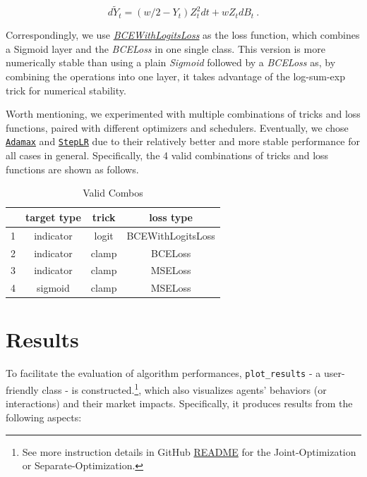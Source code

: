 \documentclass[a4paper,10pt]{article}
\newcommand{\1}{\mathbf{1}}
\begin{document}
\begin{equation}
    d \tilde{Y}_t = (w/2-Y_t)Z_t^2dt + wZ_tdB_t~.
\end{equation} 

Correspondingly, we use \href{https://pytorch.org/docs/stable/generated/torch.nn.BCEWithLogitsLoss.html}{\textit{BCEWithLogitsLoss}} as the loss function, which combines a Sigmoid layer and the \textit{BCELoss} in one single class. This version is more numerically stable than using a plain \textit{Sigmoid} followed by a  \textit{BCELoss} as, by combining the operations into one layer, it takes advantage of the log-sum-exp trick for numerical stability.

Worth mentioning, we experimented with multiple combinations of tricks
and loss functions, paired with different optimizers and schedulers.
Eventually, we chose
\href{https://pytorch.org/docs/stable/generated/torch.optim.Adamax.html}{\texttt{Adamax}}
and
\href{https://pytorch.org/docs/stable/generated/torch.optim.lr_scheduler.StepLR.html}{\texttt{StepLR}}
due to their relatively better and more stable performance for all cases
in general. Specifically, the 4 valid combinations of tricks and
loss functions are shown as follows.

\begin{table}[ht]
    \centering
    \begin{tabular}{*{4}{c}}
        \toprule
        \, & \textbf{target type} & \textbf{trick} & \textbf{loss type} \\
        \midrule
        1 & indicator & logit & BCEWithLogitsLoss \\
        2 & indicator & clamp & BCELoss \\
        3 & indicator & clamp & MSELoss \\
        4 & sigmoid   & clamp & MSELoss \\
        \toprule
    \end{tabular}
    \caption{Valid Combos}
    \label{tab:valid-combos}
\end{table}



\newpage

\section{Results}\label{results}

To facilitate the evaluation of algorithm performances, \texttt{plot\_results} - a
user-friendly class - is constructed.\footnote{See more instruction details in GitHub \href{https://github.com/OrangeAoo/PA-MFG-FBSDE/blob/3cffc5e8dbe09fbc880f6c2c70d76e0b6a1b8c3c/2Period/Joint_Optim_2Prdx1/README.md}{README} for the Joint-Optimization or Separate-Optimization.}, which also visualizes agents' behaviors (or interactions) and their market impacts. Specifically, it produces results from the following aspects:
\end{document}
